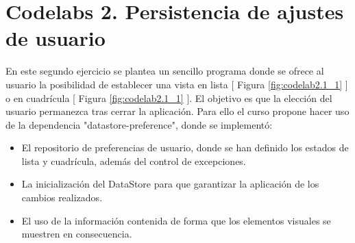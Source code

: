\documentclass{article}
\begin{document}
    \section{Codelabs 2. Persistencia de ajustes de usuario}
        En este segundo ejercicio se plantea un sencillo programa donde se ofrece al usuario
         la posibilidad de establecer una vista en lista [ Figura \ref{fig:codelab2.1_1} ] o
         en cuadrícula [ Figura \ref{fig:codelab2.1_1} ]. El objetivo es que la elección del
         usuario permanezca tras cerrar la aplicación. Para ello el curso propone hacer uso
         de la dependencia "datastore-preference", donde se implementó:

        \begin{itemize}
            \item El repositorio de preferencias de usuario, donde se han definido
                   los estados de lista y cuadrícula, además del control de excepciones.
            \item La inicialización del DataStore para que garantizar la aplicación
                   de los cambios realizados.
            \item El uso de la información contenida de forma que los elementos visuales
                   se muestren en consecuencia.
        \end{itemize}
\end{document}
